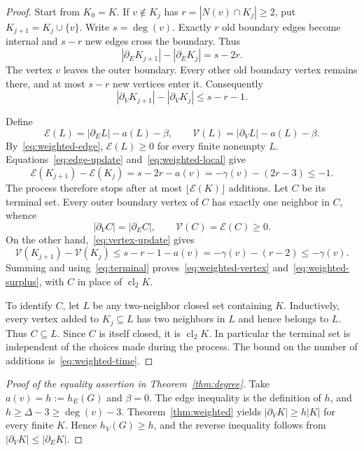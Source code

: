 \documentclass[11pt]{amsart}
\numberwithin{equation}{section}
\theoremstyle{definition}
\theoremstyle{remark}
\newcommand{\hE}{h_E}
\newcommand{\hV}{h_V}
\newcommand{\bE}{\partial_E}
\newcommand{\bV}{\partial_V}
\newcommand{\cl}{\operatorname{cl}_2}
\newcommand{\EE}{\mathcal E}
\newcommand{\VV}{\mathcal V}
\begin{document}
\begin{proof}
Start from $K_0=K$. If $v\notin K_j$ has $r=|N(v)\cap K_j|\ge2$, put $K_{j+1}=K_j\cup\{v\}$. Write $s=\deg(v)$. Exactly $r$ old boundary edges become internal and $s-r$ new edges cross the boundary. Thus
\begin{equation}\label{eq:edge-update}
|\bE K_{j+1}|-|\bE K_j|=s-2r.
\end{equation}
The vertex $v$ leaves the outer boundary. Every other old boundary vertex remains there, and at most $s-r$ new vertices enter it. Consequently
\begin{equation}\label{eq:vertex-update}
|\bV K_{j+1}|-|\bV K_j|\le s-r-1.
\end{equation}

Define
\[
\EE(L)=|\bE L|-a(L)-\beta,\qquad
\VV(L)=|\bV L|-a(L)-\beta.
\]
By~\eqref{eq:weighted-edge}, $\EE(L)\ge0$ for every finite nonempty $L$. Equations~\eqref{eq:edge-update} and~\eqref{eq:weighted-local} give
\begin{equation}\label{eq:Edecrease}
\EE(K_{j+1})-\EE(K_j)
=s-2r-a(v)=-\gamma(v)-(2r-3)\le-1.
\end{equation}
The process therefore stops after at most $\lfloor\EE(K)\rfloor$ additions. Let $C$ be its terminal set. Every outer boundary vertex of $C$ has exactly one neighbor in $C$, whence
\begin{equation}\label{eq:terminal}
|\bV C|=|\bE C|,\qquad \VV(C)=\EE(C)\ge0.
\end{equation}
On the other hand,~\eqref{eq:vertex-update} gives
\begin{equation}\label{eq:Vdecrease}
\VV(K_{j+1})-\VV(K_j)
\le s-r-1-a(v)=-\gamma(v)-(r-2)\le-\gamma(v).
\end{equation}
Summing and using~\eqref{eq:terminal} proves~\eqref{eq:weighted-vertex} and~\eqref{eq:weighted-surplus}, with $C$ in place of $\cl K$.

To identify $C$, let $L$ be any two-neighbor closed set containing $K$. Inductively, every vertex added to $K_j\subseteq L$ has two neighbors in $L$ and hence belongs to $L$. Thus $C\subseteq L$. Since $C$ is itself closed, it is $\cl K$. In particular the terminal set is independent of the choices made during the process. The bound on the number of additions is~\eqref{eq:weighted-time}.
\end{proof}

\begin{proof}[Proof of the equality assertion in Theorem~\ref{thm:degree}]
Take $a(v)=h:=\hE(G)$ and $\beta=0$. The edge inequality is the definition of $h$, and $h\ge\Delta-3\ge\deg(v)-3$. Theorem~\ref{thm:weighted} yields $|\bV K|\ge h|K|$ for every finite $K$. Hence $\hV(G)\ge h$, and the reverse inequality follows from $|\bV K|\le|\bE K|$.
\end{proof}
\end{document}
